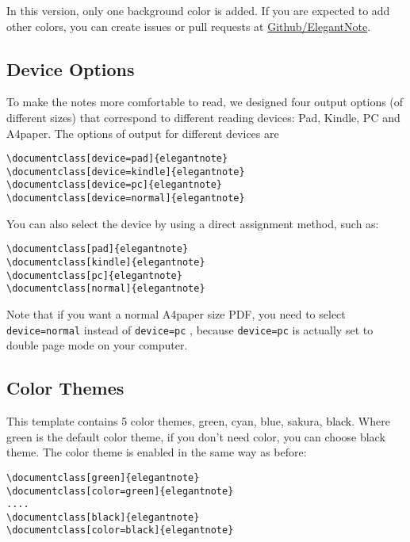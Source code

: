 \documentclass[geye,green,pad,en]{elegantnote}
\begin{document}
\begin{remark}
In this version, only one background color is added. If you are expected to add other colors, you can create issues or pull requests at \href{https://github.com/ElegantLaTeX/ElegantNote}{Github/ElegantNote}.
\end{remark}

\subsection{Device Options}

To make the notes more comfortable to read, we designed four output options (of different sizes) that correspond to different reading devices: Pad, Kindle, PC and A4paper. The options of output for different devices are
\begin{lstlisting}[frame=none]  
\documentclass[device=pad]{elegantnote}
\documentclass[device=kindle]{elegantnote}
\documentclass[device=pc]{elegantnote}
\documentclass[device=normal]{elegantnote}
\end{lstlisting}
\begin{note}
You can also select the device by using a direct assignment method, such as:
\end{note}
\begin{lstlisting}[frame=none]  
\documentclass[pad]{elegantnote}
\documentclass[kindle]{elegantnote}
\documentclass[pc]{elegantnote}
\documentclass[normal]{elegantnote}
\end{lstlisting}

\begin{note}
Note that if you want a normal A4paper size PDF, you need to select \lstinline{device=normal} instead of \lstinline{device=pc} , because \lstinline{device=pc} is actually set to double page mode on your computer.
\end{note}
\subsection{Color Themes}
This template contains 5 color themes, \textcolor{egreen}{green}, \textcolor{ecyan}{cyan}, \textcolor{eblue}{blue}, \textcolor{sakura}{sakura}, \textcolor{black}{black}. Where green is the default color theme, if you don't need color, you can choose black theme. The color theme is enabled in the same way as before:
\begin{lstlisting}[frame=none]  
\documentclass[green]{elegantnote}
\documentclass[color=green]{elegantnote}
....
\documentclass[black]{elegantnote}
\documentclass[color=black]{elegantnote}
\end{lstlisting}
\end{document}
